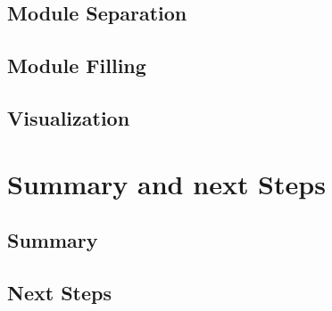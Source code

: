 \section{Module Separation}
\section{Module Filling}
\section{Visualization}

\chapter{Summary and next Steps}
\section{Summary}
\section{Next Steps}